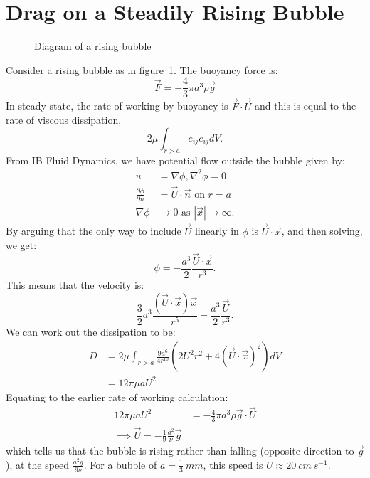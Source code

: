 \documentclass[../Main.tex]{subfiles}
\begin{document}
\section{Drag on a Steadily Rising Bubble}
\begin{figure}
    \centering
    \caption{Diagram of a rising bubble}
    \label{figRisingBubble}
\end{figure}

Consider a rising bubble as in figure~\ref{figRisingBubble}. The buoyancy force is:
\begin{equation*}
    \vec F = -\frac43 \pi a^3 \rho \vec g
\end{equation*}
In steady state, the rate of working by buoyancy is $\vec{F} \cdot \vec{U}$ and this is equal to the rate of viscous dissipation,
\begin{equation*}
    2\mu \int_{r > a} e_{ij} e_{ij} dV.
\end{equation*}
From IB Fluid Dynamics, we have potential flow outside the bubble given by:
\begin{align*}
    u &= \nabla \phi, \nabla^2 \phi = 0 \\
    \frac{\partial \phi}{\partial n} &= \vec{U} \cdot \vec{n} \text{ on } r = a \\
    \nabla \phi &\to 0 \text{ as } |\vec x| \to \infty.
\end{align*}
By arguing that the only way to include $\vec U$ linearly in $\phi$ is $\vec{U} \cdot \vec{x}$, and then solving, we get:
\begin{equation*}
    \phi = -\frac{a^3}{2} \frac{\vec{U} \cdot \vec{x}}{r^3}.
\end{equation*}
This means that the velocity is:
\begin{equation*}
    \frac32 a^3 \frac{(\vec{U} \cdot \vec{x})\vec x}{r^5} - \frac{a^3}{2} \frac{\vec U}{r^3}.
\end{equation*}
We can work out the dissipation to be:
\begin{align*}
    D &= 2\mu\int_{r > a} \frac{9a^6}{4r^{10}} \left(2U^2 r^2 + 4 (\vec{U} \cdot \vec{x})^2\right) dV \\
    &= 12\pi\mu a U^2
\end{align*}
Equating to the earlier rate of working calculation:
\begin{align*}
    12\pi\mu a U^2 &= -\frac43 \pi a^3 \rho \vec{g} \cdot \vec{U} \\
    \implies \vec U = -\frac19 \frac{a^2}{\nu} \vec g
\end{align*}
which tells us that the bubble is rising rather than falling (opposite direction to $\vec g$), at the speed $\frac{a^2 g}{9\nu}$. For a bubble of $a = \frac13~mm$, this speed is $U \approx 20~cm~s^{-1}$.
\end{document}
